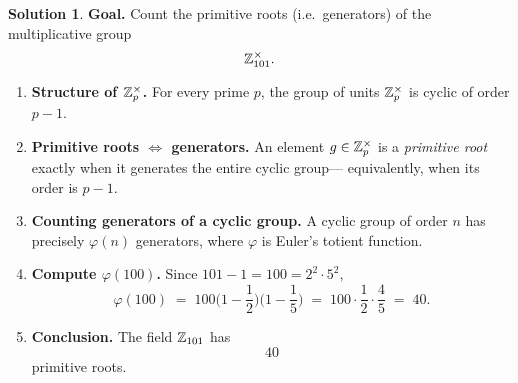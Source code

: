\documentclass[12pt]{article}
\theoremstyle{definition} %
\newtheorem{solution}{Solution}
\theoremstyle{plain} %
\begin{document}
      \begin{solution}
        \textbf{Goal.}  Count the primitive roots (i.e.\ generators) of the multiplicative group
        \[
          \Bbb Z_{101}^{\times}.
        \]
        
        \begin{enumerate}[label=\textbf{Step \arabic*:}, leftmargin=*]
          \item \textbf{Structure of \(\Bbb Z_{p}^{\times}\).}  
                For every prime \(p\), the group of units
                \(\Bbb Z_{p}^{\times}\) is cyclic of order \(p-1\).
        
          \item \textbf{Primitive roots \(\Longleftrightarrow\) generators.}  
                An element \(g\in\Bbb Z_{p}^{\times}\) is a \emph{primitive root}
                exactly when it generates the entire cyclic group—
                equivalently, when its order is \(p-1\).
        
          \item \textbf{Counting generators of a cyclic group.}  
                A cyclic group of order \(n\) has precisely
                \(\varphi(n)\) generators, where \(\varphi\) is Euler’s
                totient function.
        
          \item \textbf{Compute \(\varphi(100)\).}  
                Since \(101-1=100=2^{2}\cdot5^{2}\),
                \[
                  \varphi(100)
                  \;=\;100\!\bigl(1-\frac12\bigr)\!\bigl(1-\frac15\bigr)
                  \;=\;100\cdot\frac12\cdot\frac45
                  \;=\;40.
                \]
        
          \item \textbf{Conclusion.}  
                The field \(\Bbb Z_{101}\) has
                \[
                  \boxed{40}
                \]
                primitive roots.
        \end{enumerate}
        \end{solution}
\end{document}
